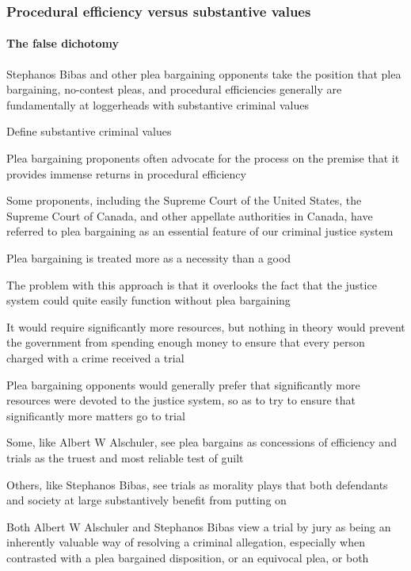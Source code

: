 \subsubsection{Procedural efficiency versus substantive values}

\paragraph{The false dichotomy\\}

Stephanos Bibas and other plea bargaining opponents take the position that plea bargaining, no-contest pleas, and procedural efficiencies generally are fundamentally at loggerheads with substantive criminal values

Define substantive criminal values

Plea bargaining proponents often advocate for the process on the premise that it provides immense returns in procedural efficiency

Some proponents, including the Supreme Court of the United States, the Supreme Court of Canada, and other appellate authorities in Canada, have referred to plea bargaining as an essential feature of our criminal justice system

Plea bargaining is treated more as a necessity than a good

The problem with this approach is that it overlooks the fact that the justice system could quite easily function without plea bargaining

It would require significantly more resources, but nothing in theory would prevent the government from spending enough money to ensure that every person charged with a crime received a trial

Plea bargaining opponents would generally prefer that significantly more resources were devoted to the justice system, so as to try to ensure that significantly more matters go to trial

Some, like Albert W Alschuler, see plea bargains as concessions of efficiency and trials as the truest and most reliable test of guilt

Others, like Stephanos Bibas, see trials as morality plays that both defendants and society at large substantively benefit from putting on

Both Albert W Alschuler and Stephanos Bibas  view a trial by jury as being an inherently valuable way of resolving a criminal allegation, especially when contrasted with a plea bargained disposition, or an equivocal plea, or both

